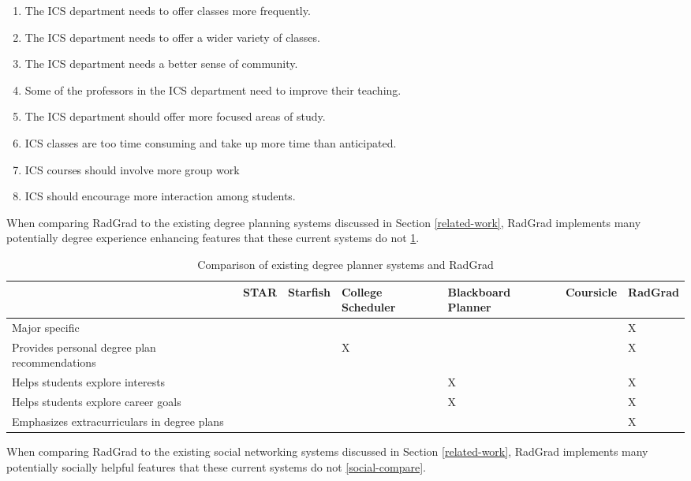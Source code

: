\begin{enumerate}
  \item The ICS department needs to offer classes more frequently.
  \item The ICS department needs to offer a wider variety of classes.
  \item The ICS department needs a better sense of community.
  \item Some of the professors in the ICS department need to improve their teaching.
  \item The ICS department should offer more focused areas of study.
  \item ICS classes are too time consuming and take up more time than anticipated.
  \item ICS courses should involve more group work 
  \item ICS should encourage more interaction among students.
\end{enumerate}

When comparing RadGrad to the existing degree planning systems discussed in Section \ref{related-work}, RadGrad implements many potentially degree experience enhancing features that these current systems do not \ref{degree-compare}. 

\begin{table}[htbp!]
\centering
\begin{tabular}{ |p{3cm}|p{2cm}|p{2cm}|p{2cm}|p{2cm}|p{2cm}|p{2cm}| } 
  \hline
 \textbf{} & \textbf{STAR} & \textbf{Starfish} & \textbf{College Scheduler} & \textbf{Blackboard Planner}  & \textbf{Coursicle}  & \textbf{RadGrad} \\ 
  \hline
  Major specific & & & & & & X\\
  \hline
    Provides personal degree plan recommendations & & & X & & & X\\
  \hline
    Helps students explore interests & & & & X & & X\\
  \hline
    Helps students explore career goals & & & & X & & X\\
  \hline
    Emphasizes extracurriculars in degree plans & & & & & & X\\
  \hline

\end{tabular}
 \caption{Comparison of existing degree planner systems and RadGrad}
  \label{degree-compare}
\end{table}

When comparing RadGrad to the existing social networking systems discussed in Section \ref{related-work}, RadGrad implements many potentially socially helpful features that these current systems do not \ref{social-compare}. 


